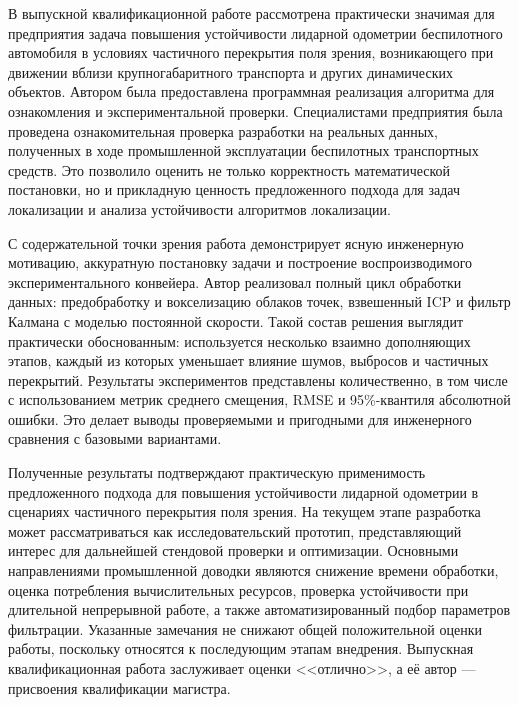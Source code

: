 \documentclass[master, fontsize=12pt]{diploma}
\begin{document}
\fillReviewHeader

В выпускной квалификационной работе рассмотрена практически значимая для предприятия задача повышения устойчивости лидарной одометрии беспилотного автомобиля в условиях частичного перекрытия поля зрения, возникающего при движении вблизи крупногабаритного транспорта и других динамических объектов. Автором была предоставлена программная реализация алгоритма для ознакомления и экспериментальной проверки. Специалистами предприятия была проведена ознакомительная проверка разработки на реальных данных, полученных в ходе промышленной эксплуатации беспилотных транспортных средств. Это позволило оценить не только корректность математической постановки, но и прикладную ценность предложенного подхода для задач локализации и анализа устойчивости алгоритмов локализации.

С содержательной точки зрения работа демонстрирует ясную инженерную мотивацию, аккуратную постановку задачи и построение воспроизводимого экспериментального конвейера. Автор реализовал полный цикл обработки данных: предобработку и вокселизацию облаков точек, взвешенный ICP и фильтр Калмана с моделью постоянной скорости. Такой состав решения выглядит практически обоснованным: используется несколько взаимно дополняющих этапов, каждый из которых уменьшает влияние шумов, выбросов и частичных перекрытий. Результаты экспериментов представлены количественно, в том числе с использованием метрик среднего смещения, RMSE и 95\%-квантиля абсолютной ошибки. Это делает выводы проверяемыми и пригодными для инженерного сравнения с базовыми вариантами.

Полученные результаты подтверждают практическую применимость предложенного подхода для повышения устойчивости лидарной одометрии в сценариях частичного перекрытия поля зрения. На текущем этапе разработка может рассматриваться как исследовательский прототип, представляющий интерес для дальнейшей стендовой проверки и оптимизации. Основными направлениями промышленной доводки являются снижение времени обработки, оценка потребления вычислительных ресурсов, проверка устойчивости при длительной непрерывной работе, а также автоматизированный подбор параметров фильтрации. Указанные замечания не снижают общей положительной оценки работы, поскольку относятся к последующим этапам внедрения. Выпускная квалификационная работа заслуживает оценки <<отлично>>, а её автор --- присвоения квалификации магистра.

\makeReviewSignature
\end{document}
